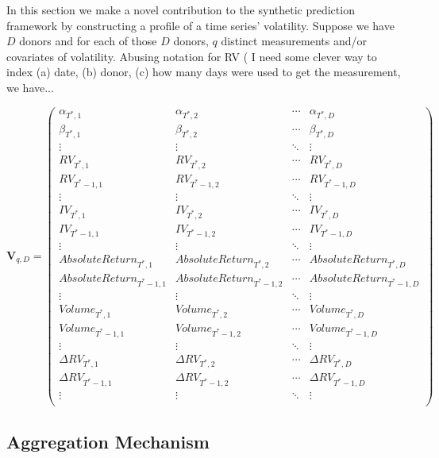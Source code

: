 \documentclass[11pt]{article}
\theoremstyle{definition}
\begin{document}
In this section we make a novel contribution to the synthetic prediction framework by constructing a profile of a time series' volatility.  Suppose we have $D$ donors and for each of those $D$ donors, $q$ distinct measurements and/or covariates of volatility.  Abusing notation for RV ( I need some clever way to index (a) date, (b) donor, (c) how many days were used to get the measurement, we have...

\begin{equation*}
\textbf{V}_{q,D} = 
\begin{pmatrix}
\alpha_{T^{*},1} & \alpha_{T^{*},2}  & \cdots & \alpha_{T^{*},D}  \\
\beta_{T^{*},1} & \beta_{T^{*},2}  & \cdots & \beta_{T^{*},D}  \\
\vdots  & \vdots  & \ddots & \vdots  \\
RV_{T^{*},1} & RV_{T^{*},2}  & \cdots & RV_{T^{*},D}  \\
RV_{T^{*}-1,1}  & RV_{T^{*}-1,2}  & \cdots & RV_{T^{*}-1,D}  \\
\vdots  & \vdots  & \ddots & \vdots  \\
IV_{T^{*},1} & IV_{T^{*},2} & \cdots & IV_{T^{*},D} \\
IV_{T^{*}-1,1}  & IV_{T^{*}-1,2}  & \cdots & IV_{T^{*}-1,D} \\
\vdots  & \vdots  & \ddots & \vdots  \\
AbsoluteReturn_{T^{*},1} & AbsoluteReturn_{T^{*},2} & \cdots & AbsoluteReturn_{T^{*},D} \\
AbsoluteReturn_{T^{*}-1,1}  & AbsoluteReturn_{T^{*}-1,2}  & \cdots & AbsoluteReturn_{T^{*}-1,D} \\
\vdots  & \vdots  & \ddots & \vdots  \\
Volume_{T^{*},1}  & Volume_{T^{*},2}  & \cdots & Volume_{T^{*},D} \\
Volume_{T^{*}-1,1}  & Volume_{T^{*}-1,2}  & \cdots & Volume_{T^{*}-1,D}  \\
\vdots  & \vdots  & \ddots & \vdots  \\
\Delta RV_{T^{*},1} & \Delta RV_{T^{*},2}  & \cdots & \Delta RV_{T^{*},D}  \\
\Delta RV_{T^{*}-1,1}  & \Delta RV_{T^{*}-1,2}  & \cdots & \Delta RV_{T^{*}-1,D}  \\
\vdots  & \vdots  & \ddots & \vdots  \\
\end{pmatrix}
\end{equation*}


\subsection{Aggregation Mechanism}
\label{Aggregation Mechanism}
\end{document}
